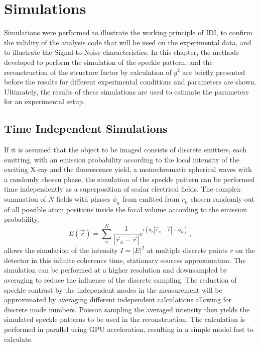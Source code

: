 \chapter{Simulations}
\label{chap:simulation}


Simulations were performed to illustrate the working principle of IDI, to confirm the validity of the analysis code that will be used on the experimental data, and to illustrate the Signal-to-Noise characteristics. 
In this chapter, the methods developed to perform the simulation of the speckle pattern, and the reconstruction of the structure factor by calculation of $g^2$ are briefly presented before the results for different experimental conditions and parameters are shown. Ultimately, the results of these simulations are used to estimate the parameters for an experimental setup.

\section{Time Independent Simulations}
If it is assumed that the object to be imaged consists of discrete emitters, each emitting, with an emission probability according to the local intensity of the exciting X-ray and the fluorescence yield, a monochromatic spherical waves with a randomly chosen phase, the simulation of the speckle pattern can be performed time independently as a superposition of scalar electrical fields.  The complex summation of $N$ fields with phases $\phi_n$ from  emitted from $r_n$ chosen randomly out of all possible atom positions inside the focal volume according to the emission probability,
\begin{equation}
	E(\vec{r})=\sum_n^N \frac{1}{\left|\vec{r}_n-\vec{r}\right|} e^{i(k_n{\left|\vec{r}_n-\vec{r}\right|}+\phi_n)} \,,
\end{equation}
allows the simulation of the intensity $I=\left|E\right|^2$ at multiple discrete points $r$ on the detector in this infinite coherence time, stationary sources approximation.  The simulation can be performed at a higher resolution and downsampled by averaging to reduce the influence of the discrete sampling. The reduction of speckle contrast by the independent modes in the measurement will be approximated by averaging different independent calculations allowing for discrete mode numbers. Poisson sampling the averaged intensity then yields the simulated speckle patterns to be used in the reconstruction. 
The calculation is performed in parallel using GPU acceleration, resulting in a simple model fast to calculate.

